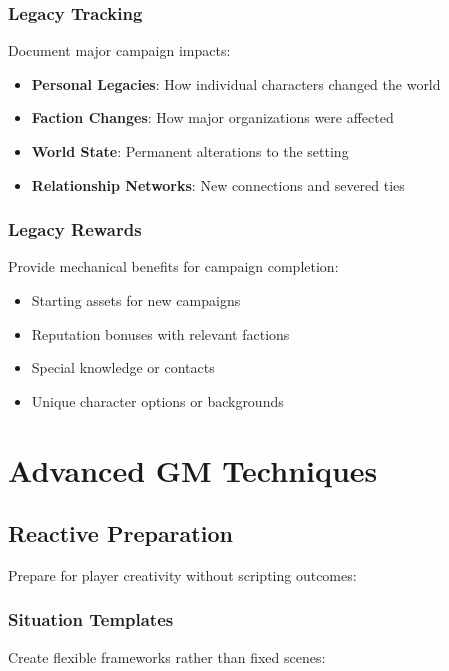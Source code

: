 \documentclass[11pt]{article}
\begin{document}
\subsubsection{Legacy Tracking}

Document major campaign impacts:

\begin{itemize}
  \item \textbf{Personal Legacies}: How individual characters changed the world
  \item \textbf{Faction Changes}: How major organizations were affected
  \item \textbf{World State}: Permanent alterations to the setting
  \item \textbf{Relationship Networks}: New connections and severed ties
\end{itemize}

\subsubsection{Legacy Rewards}

Provide mechanical benefits for campaign completion:

\begin{itemize}
  \item Starting assets for new campaigns
  \item Reputation bonuses with relevant factions
  \item Special knowledge or contacts
  \item Unique character options or backgrounds
\end{itemize}

\section{Advanced GM Techniques}

\subsection{Reactive Preparation}

Prepare for player creativity without scripting outcomes:

\subsubsection{Situation Templates}

Create flexible frameworks rather than fixed scenes:
\end{document}
